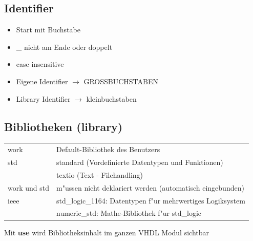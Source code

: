 \begin{minipage}{0.4\textwidth}
\subsection{Identifier}
		\begin{itemize}
			\setlength{\itemsep}{0pt}
  			\setlength{\parskip}{0pt}
  			\setlength{\parsep}{0pt}
				\item Start mit Buchstabe
				\item \_ nicht am Ende oder doppelt
				\item case insensitive
				\item Eigene Identifier $\rightarrow$ GROSSBUCHSTABEN
				\item Library Identifier $\rightarrow$ kleinbuchstaben
		\end{itemize}
\end{minipage}	
\begin{minipage}{0.59\textwidth}
\subsection{Bibliotheken (library)}
		\begin{tabular}{ll}
			work & Default-Bibliothek des Benutzers \\
			std & standard (Vordefinierte Datentypen und Funktionen)\\
			& textio (Text -  Filehandling)\\
			work und std &m"ussen nicht deklariert werden (automatisch eingebunden)\\
			ieee & std\_logic\_1164: Datentypen f"ur mehrwertiges Logiksystem\\
			& numeric\_std: Mathe-Bibliothek f"ur std\_logic
		\end{tabular}
\end{minipage}
	
	
		
		\begin{multicols}{2}
			
		\end{multicols}
		 Mit \textbf{use} wird Bibliotheksinhalt im ganzen VHDL Modul sichtbar



